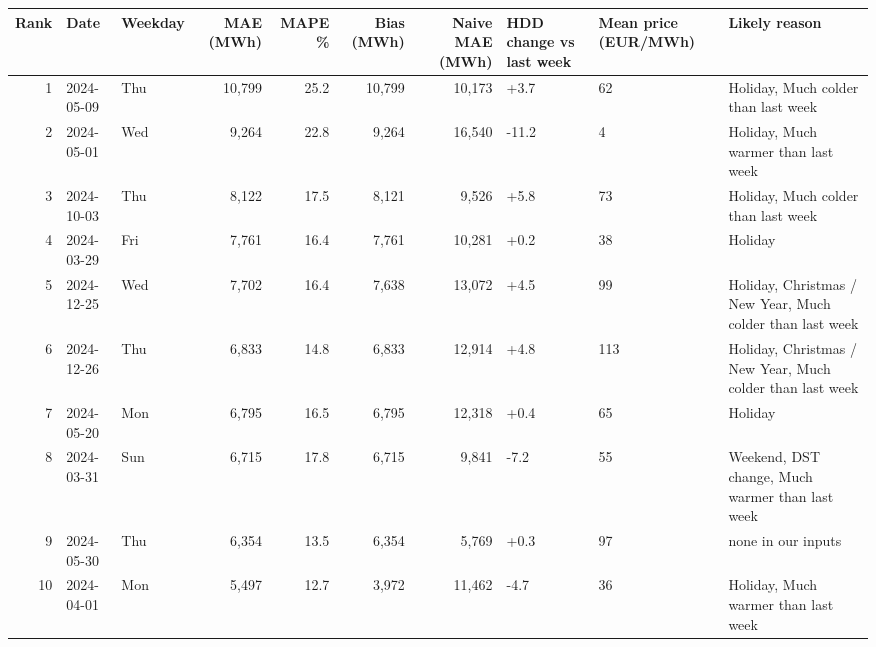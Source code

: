 \begin{tabular}{rllrrrrlll}
\toprule
Rank & Date & Weekday & MAE (MWh) & MAPE \% & Bias (MWh) & Naive MAE (MWh) & HDD change vs last week & Mean price (EUR/MWh) & Likely reason \\
\midrule
1 & 2024-05-09 & Thu & 10,799 & 25.2 & 10,799 & 10,173 & +3.7 & 62 & Holiday, Much colder than last week \\
2 & 2024-05-01 & Wed & 9,264 & 22.8 & 9,264 & 16,540 & -11.2 & 4 & Holiday, Much warmer than last week \\
3 & 2024-10-03 & Thu & 8,122 & 17.5 & 8,121 & 9,526 & +5.8 & 73 & Holiday, Much colder than last week \\
4 & 2024-03-29 & Fri & 7,761 & 16.4 & 7,761 & 10,281 & +0.2 & 38 & Holiday \\
5 & 2024-12-25 & Wed & 7,702 & 16.4 & 7,638 & 13,072 & +4.5 & 99 & Holiday, Christmas / New Year, Much colder than last week \\
6 & 2024-12-26 & Thu & 6,833 & 14.8 & 6,833 & 12,914 & +4.8 & 113 & Holiday, Christmas / New Year, Much colder than last week \\
7 & 2024-05-20 & Mon & 6,795 & 16.5 & 6,795 & 12,318 & +0.4 & 65 & Holiday \\
8 & 2024-03-31 & Sun & 6,715 & 17.8 & 6,715 & 9,841 & -7.2 & 55 & Weekend, DST change, Much warmer than last week \\
9 & 2024-05-30 & Thu & 6,354 & 13.5 & 6,354 & 5,769 & +0.3 & 97 & none in our inputs \\
10 & 2024-04-01 & Mon & 5,497 & 12.7 & 3,972 & 11,462 & -4.7 & 36 & Holiday, Much warmer than last week \\
\bottomrule
\end{tabular}
